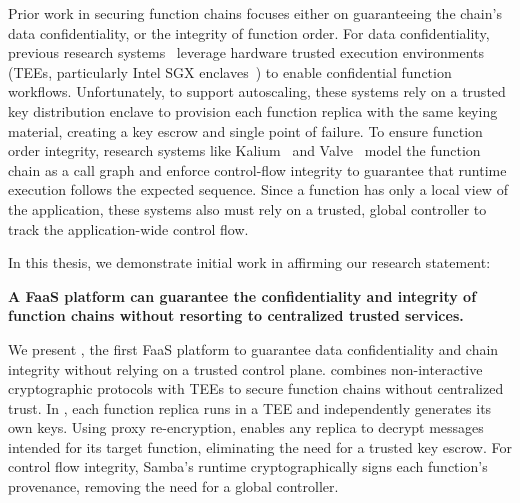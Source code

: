 %
Prior work in securing function chains focuses either on guaranteeing the
chain's data confidentiality, or the integrity of function order.
%
For data confidentiality, previous research systems~\cite{16-osdi-ryoan,
    19-ccsw-s_faas,
    19-systor-clemmys,
    19-systor-trust_more_serverless,
    21-isca-confidential_serverless,
    23-sec-confidential_serverless,
    23-socc-cryonics}
leverage hardware trusted execution environments (TEEs, particularly Intel SGX
enclaves~\cite{13-hasp-innovative_instructions, 16-techreport-intel_sgx_explained})
to enable confidential function workflows.
%
Unfortunately, to support autoscaling, these systems rely on a trusted
key distribution enclave to provision each function replica with the same
keying material, creating a key escrow and single point of failure.
%
To ensure function order integrity, research systems like
Kalium~\cite{23-sec-kalium} and Valve~\cite{20-www-valve}
model the function chain as a call graph and enforce control-flow integrity to
guarantee that runtime execution follows the expected sequence.
%
Since a function has only a local view of the application, these systems also
must rely on a trusted, global controller to track the application-wide control
flow.


In this thesis, we demonstrate initial work in affirming our research
statement:
%
\begin{tcolorbox}[boxsep=1pt]
\textbf{
    A FaaS platform can guarantee the confidentiality and integrity of function
    chains without resorting to centralized trusted services.
}
\end{tcolorbox}

%

We present \SystemName, the first FaaS platform to guarantee data
confidentiality and chain integrity without relying on a trusted control plane.
%
\SystemName combines non-interactive cryptographic protocols
with TEEs to secure function chains without centralized trust.
%
In \SystemName, each function replica runs in a TEE and independently generates
its own keys.
%
Using proxy re-encryption, \SystemName enables any replica to decrypt
messages intended for its target function, eliminating the need for a trusted
key escrow.
%
For control flow integrity, Samba's runtime cryptographically signs each
function's provenance, removing the need for a global controller.
%



